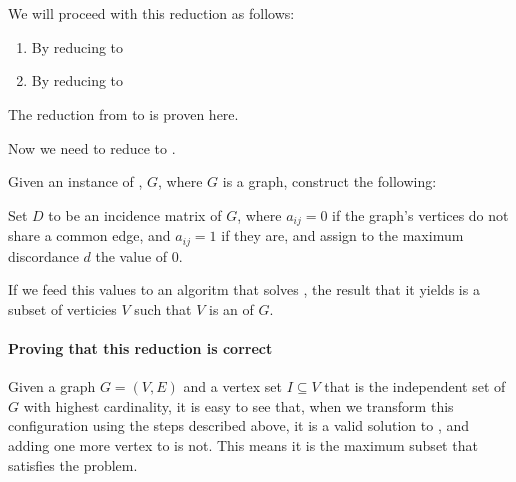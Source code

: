 \\ \\
We will proceed with this reduction as follows:
\begin{enumerate}
  \item By reducing \tsat{} to \is{}
  \item By reducing \is{} to \exc
\end{enumerate}
The reduction from \tsat{} to \is{} is proven here\cite{indep_set_proof}.

Now we need to reduce \is{} to \exc{}.

Given an instance of \is{}, $G$, where $G$ is a graph, construct the following:

Set $D$ to be an incidence matrix of $G$, where $a_{ij}=0$ if the graph's vertices do not share a common edge, and $a_{ij}=1$ if they are, and assign to the maximum discordance $d$ the value of 0.

If we feed this values to an algoritm that solves \exc{}, the result that it yields is a subset of verticies $V$ such that $V$ is an \is{} of $G$.

\paragraph{Proving that this reduction is correct}
Given a graph $G = (V,E)$ and a vertex set $I \subseteq V$ that is the independent set of $G$ with highest cardinality, it is easy to see that, when we transform this configuration using the steps described above, it is a valid solution to \exc{}, and adding one more vertex to is not. This means it is the maximum subset that satisfies the problem.
